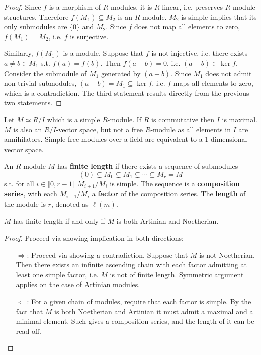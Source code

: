 \documentclass{article}
\begin{document}
\begin{proof}
    Since $f$ is a morphism of $R$-modules, it is $R$-linear, i.e. preserves $R$-module structures. Therefore $f(M_1) \subseteq M_2$ is an $R$-module. $M_2$ is simple implies that its only submodules are $\{0\}$ and $M_2$. Since $f$ does not map all elements to zero, $f(M_1) = M_2$, i.e. $f$ is surjective.

    Similarly, $f(M_1)$ is a module. Suppose that $f$ is not injective, i.e. there exists $a\neq b \in M_1$ s.t. $f(a) = f(b)$. Then $f(a - b) = 0$, i.e. $(a - b)\in\ker f$. Consider the submodule of $M_1$ generated by $(a - b)$. Since $M_1$ does not admit non-trivial submodules, $(a - b) = M_1 \subseteq \ker f$, i.e. $f$ maps all elements to zero, which is a contradiction. The third statement results directly from the previous two statements.
\end{proof}

\begin{remark}
    Let $M\simeq R/I$ which is a simple $R$-module. If $R$ is commutative then $I$ is maximal. $M$ is also an $R/I$-vector space, but not a free $R$-module as all elements in $I$ are annihilators. Simple free modules over a field are equivalent to a 1-dimensional vector space.
\end{remark}

\begin{definition}
    An $R$-module $M$ has \textbf{finite length} if there exists a sequence of submodules
    \[
        (0) \subsetneq M_0 \subsetneq M_1 \subsetneq \cdots \subsetneq M_r = M
    \]
    s.t. for all $i\in\llbracket 0, r - 1 \rrbracket$ $M_{i+1}/M_i$ is simple. The sequence is a \textbf{composition series}, with each $M_{i+1}/M_i$ a \textbf{factor} of the composition series. The \textbf{length} of the module is $r$, denoted as $\ell(m)$.
\end{definition}

\begin{proposition}\label{prop:Finite length implies Noeth and Artin}
    $M$ has finite length if and only if $M$ is both Artinian and Noetherian.
\end{proposition}

\begin{proof}
    Proceed via showing implication in both directions:
    \begin{itemize}
        \item[$\Rightarrow$:] Proceed via showing a contradiction. Suppose that $M$ is not Noetherian. Then there exists an infinite ascending chain with each factor admitting at least one simple factor, i.e. $M$ is not of finite length. Symmetric argument applies on the case of Artinian modules.
        \item[$\Leftarrow$:] For a given chain of modules, require that each factor is simple. By the fact that $M$ is both Noetherian and Artinian it must admit a maximal and a minimal element. Such gives a composition series, and the length of it can be read off. 
    \end{itemize}
\end{proof}
\end{document}
